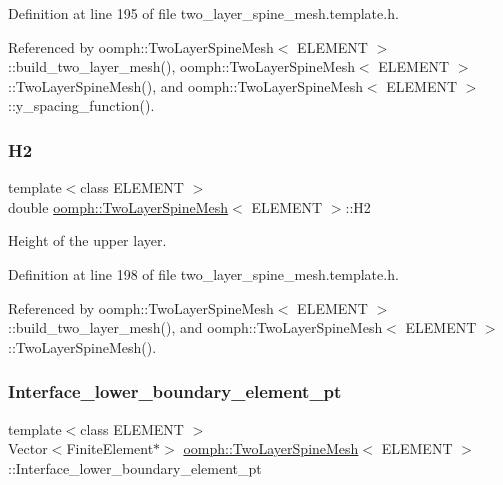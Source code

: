 Definition at line 195 of file two\+\_\+layer\+\_\+spine\+\_\+mesh.\+template.\+h.



Referenced by oomph\+::\+Two\+Layer\+Spine\+Mesh$<$ E\+L\+E\+M\+E\+N\+T $>$\+::build\+\_\+two\+\_\+layer\+\_\+mesh(), oomph\+::\+Two\+Layer\+Spine\+Mesh$<$ E\+L\+E\+M\+E\+N\+T $>$\+::\+Two\+Layer\+Spine\+Mesh(), and oomph\+::\+Two\+Layer\+Spine\+Mesh$<$ E\+L\+E\+M\+E\+N\+T $>$\+::y\+\_\+spacing\+\_\+function().

\mbox{\label{classoomph_1_1TwoLayerSpineMesh_a0a7e5f7297ad653440d7d833c89d1b44}} 
\subsubsection{\texorpdfstring{H2}{H2}}
{\footnotesize\ttfamily template$<$class E\+L\+E\+M\+E\+NT $>$ \\
double \hyperlink{classoomph_1_1TwoLayerSpineMesh}{oomph\+::\+Two\+Layer\+Spine\+Mesh}$<$ E\+L\+E\+M\+E\+NT $>$\+::H2\hspace{0.3cm}{\ttfamily [protected]}}



Height of the upper layer. 



Definition at line 198 of file two\+\_\+layer\+\_\+spine\+\_\+mesh.\+template.\+h.



Referenced by oomph\+::\+Two\+Layer\+Spine\+Mesh$<$ E\+L\+E\+M\+E\+N\+T $>$\+::build\+\_\+two\+\_\+layer\+\_\+mesh(), and oomph\+::\+Two\+Layer\+Spine\+Mesh$<$ E\+L\+E\+M\+E\+N\+T $>$\+::\+Two\+Layer\+Spine\+Mesh().

\mbox{\label{classoomph_1_1TwoLayerSpineMesh_aaa5c2ad2f61cd7637b12573265b42bd7}} 
\subsubsection{\texorpdfstring{Interface\+\_\+lower\+\_\+boundary\+\_\+element\+\_\+pt}{Interface\_lower\_boundary\_element\_pt}}
{\footnotesize\ttfamily template$<$class E\+L\+E\+M\+E\+NT $>$ \\
Vector$<$Finite\+Element$\ast$$>$ \hyperlink{classoomph_1_1TwoLayerSpineMesh}{oomph\+::\+Two\+Layer\+Spine\+Mesh}$<$ E\+L\+E\+M\+E\+NT $>$\+::Interface\+\_\+lower\+\_\+boundary\+\_\+element\+\_\+pt\hspace{0.3cm}{\ttfamily [protected]}}



